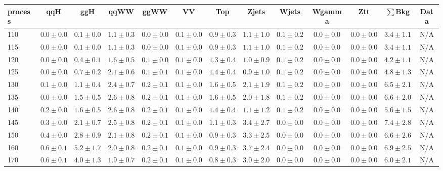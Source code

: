 \begin{table}
{%
 \tiny
 \begin{center}
 \begin{tabular}{l | c c | c c c c c c c c  | c c}
 \hline
 process & qqH & ggH & qqWW & ggWW & VV & Top & Zjets & Wjets & Wgamma & Ztt & $\sum$Bkg & Data \\
 \hline
110 & $0.0\pm0.0$ & $0.1\pm0.0$ & $1.1\pm0.3$ & $0.0\pm0.0$ & $0.1\pm0.0$ & $0.9\pm0.3$ & $1.1\pm1.0$ & $0.1\pm0.2$ & $0.0\pm0.0$ & $0.0\pm0.0$ & $3.4\pm1.1$ & N/A \\
115 & $0.0\pm0.0$ & $0.1\pm0.0$ & $1.1\pm0.3$ & $0.0\pm0.0$ & $0.1\pm0.0$ & $0.9\pm0.3$ & $1.1\pm1.0$ & $0.1\pm0.2$ & $0.0\pm0.0$ & $0.0\pm0.0$ & $3.4\pm1.1$ & N/A \\
120 & $0.0\pm0.0$ & $0.4\pm0.1$ & $1.6\pm0.5$ & $0.1\pm0.0$ & $0.1\pm0.0$ & $1.3\pm0.4$ & $1.0\pm0.9$ & $0.1\pm0.2$ & $0.0\pm0.0$ & $0.0\pm0.0$ & $4.2\pm1.1$ & N/A \\
125 & $0.0\pm0.0$ & $0.7\pm0.2$ & $2.1\pm0.6$ & $0.1\pm0.1$ & $0.1\pm0.0$ & $1.4\pm0.4$ & $0.9\pm1.0$ & $0.1\pm0.2$ & $0.0\pm0.0$ & $0.0\pm0.0$ & $4.8\pm1.3$ & N/A \\
130 & $0.1\pm0.0$ & $1.1\pm0.4$ & $2.4\pm0.7$ & $0.2\pm0.1$ & $0.1\pm0.0$ & $1.6\pm0.5$ & $2.1\pm1.9$ & $0.1\pm0.2$ & $0.0\pm0.0$ & $0.0\pm0.0$ & $6.5\pm2.1$ & N/A \\
135 & $0.0\pm0.0$ & $1.5\pm0.5$ & $2.6\pm0.8$ & $0.2\pm0.1$ & $0.1\pm0.0$ & $1.6\pm0.5$ & $2.0\pm1.8$ & $0.1\pm0.2$ & $0.0\pm0.0$ & $0.0\pm0.0$ & $6.6\pm2.0$ & N/A \\
140 & $0.2\pm0.0$ & $1.6\pm0.5$ & $2.6\pm0.8$ & $0.2\pm0.1$ & $0.1\pm0.0$ & $1.4\pm0.4$ & $1.1\pm1.2$ & $0.1\pm0.2$ & $0.0\pm0.0$ & $0.0\pm0.0$ & $5.6\pm1.5$ & N/A \\
145 & $0.3\pm0.0$ & $2.1\pm0.7$ & $2.5\pm0.8$ & $0.2\pm0.1$ & $0.1\pm0.0$ & $1.1\pm0.3$ & $3.4\pm2.7$ & $0.0\pm0.0$ & $0.0\pm0.0$ & $0.0\pm0.0$ & $7.4\pm2.8$ & N/A \\
150 & $0.4\pm0.0$ & $2.8\pm0.9$ & $2.1\pm0.8$ & $0.2\pm0.1$ & $0.1\pm0.0$ & $0.9\pm0.3$ & $3.3\pm2.5$ & $0.0\pm0.0$ & $0.0\pm0.0$ & $0.0\pm0.0$ & $6.6\pm2.6$ & N/A \\
160 & $0.6\pm0.1$ & $5.2\pm1.7$ & $2.0\pm0.8$ & $0.2\pm0.1$ & $0.1\pm0.0$ & $0.9\pm0.3$ & $3.7\pm2.4$ & $0.0\pm0.0$ & $0.0\pm0.0$ & $0.0\pm0.0$ & $6.9\pm2.5$ &  N/A \\
170 & $0.6\pm0.1$ & $4.0\pm1.3$ & $1.9\pm0.7$ & $0.2\pm0.1$ & $0.1\pm0.0$ & $0.8\pm0.3$ & $3.0\pm2.0$ & $0.0\pm0.0$ & $0.0\pm0.0$ & $0.0\pm0.0$ & $6.0\pm2.1$ &  N/A \\

\end{tabular}
\end{center}}
\end{table}

